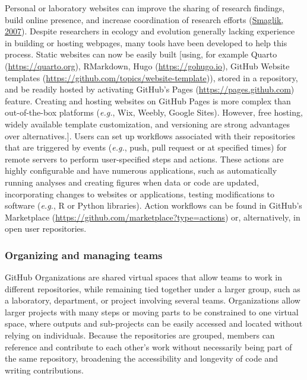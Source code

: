 Personal or laboratory websites can improve the sharing of research findings, build online presence, and increase coordination of research efforts (\protect\hyperlink{ref-HiIPSSHV}{Smaglik, 2007}).
Despite researchers in ecology and evolution generally lacking experience in building or hosting webpages, many tools have been developed to help this process.
Static websites can now be easily built {[}using, for example Quarto (\url{https://quarto.org}), RMarkdown, Hugo (\url{https://gohugo.io}), GitHub Website templates (\url{https://github.com/topics/website-template})), stored in a repository, and be readily hosted by activating GitHub's Pages (\url{https://pages.github.com}) feature.
Creating and hosting websites on GitHub Pages is more complex than out-of-the-box platforms (\emph{e.g.}, Wix, Weebly, Google Sites).
However, free hosting, widely available template customization, and versioning are strong advantages over alternatives.{]}.
Users can set up workflows associated with their repositories that are triggered by events (\emph{e.g.}, push, pull request or at specified times) for remote servers to perform user-specified steps and actions.
These actions are highly configurable and have numerous applications, such as automatically running analyses and creating figures when data or code are updated, incorporating changes to websites or applications, testing modifications to software (\emph{e.g.}, R or Python libraries).
Action workflows can be found in GitHub's Marketplace (\url{https://github.com/marketplace?type=actions}) or, alternatively, in open user repositories.

\hypertarget{organizations}{%
\subsubsection{Organizing and managing teams}\label{organizations}}

GitHub Organizations are shared virtual spaces that allow teams to work in different repositories, while remaining tied together under a larger group, such as a laboratory, department, or project involving several teams.
Organizations allow larger projects with many steps or moving parts to be constrained to one virtual space, where outputs and sub-projects can be easily accessed and located without relying on individuals.
Because the repositories are grouped, members can reference and contribute to each other's work without necessarily being part of the same repository, broadening the accessibility and longevity of code and writing contributions.

